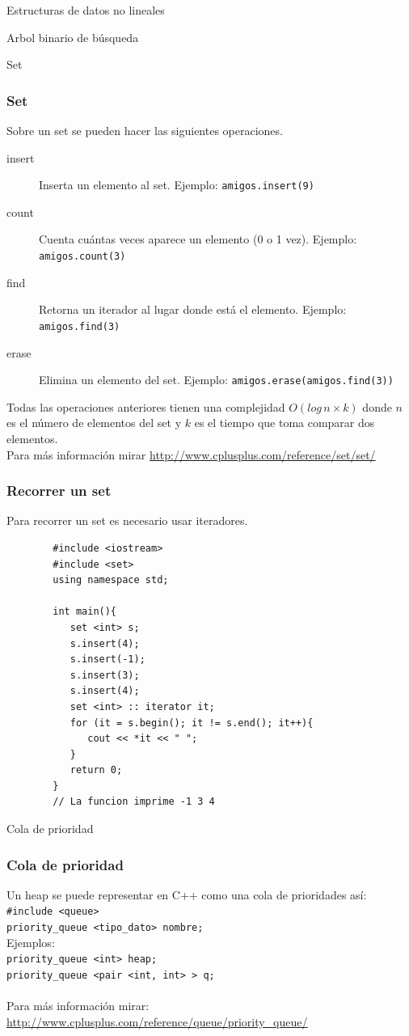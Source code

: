 \documentclass{beamer}
\begin{document}
\begin{section}{Estructuras de datos no lineales}
\begin{subsection}{Arbol binario de búsqueda}
\begin{subsubsection}{Set}
	\begin{frame}[fragile]
		\frametitle{Set}
		Sobre un set se pueden hacer las siguientes operaciones.
		\begin{description}
			\item[insert] Inserta un elemento al set. Ejemplo: \verb|amigos.insert(9)|
			\item[count] Cuenta cuántas veces aparece un elemento (0 o 1 vez). Ejemplo: \verb|amigos.count(3)|
			\item[find] Retorna un iterador al lugar donde está el elemento. Ejemplo: \verb|amigos.find(3)|
			\item[erase] Elimina un elemento del set. Ejemplo: \verb|amigos.erase(amigos.find(3))|
		\end{description}
		Todas las operaciones anteriores tienen una complejidad $O(log\,n \times k)$ donde $n$ es el número de elementos del set y $k$ es el tiempo que toma comparar dos elementos.\\
		Para más información mirar \url{http://www.cplusplus.com/reference/set/set/}
	\end{frame}

	\begin{frame}[fragile]
		\frametitle{Recorrer un set}
		Para recorrer un set es necesario usar iteradores.\\
		\begin{lstlisting}
		#include <iostream>
		#include <set>
		using namespace std;

		int main(){
		   set <int> s;
		   s.insert(4); 
		   s.insert(-1);
		   s.insert(3);
		   s.insert(4);
		   set <int> :: iterator it;
		   for (it = s.begin(); it != s.end(); it++){
		      cout << *it << " ";
		   }
		   return 0;
		}
		// La funcion imprime -1 3 4
		\end{lstlisting}
	\end{frame}
\end{subsubsection}
\begin{subsubsection}{Cola de prioridad}
	\begin{frame}[fragile]
		\frametitle{Cola de prioridad}
		Un heap se puede representar en C++ como una cola de prioridades así:
		\verb|#include <queue>|\\
		\verb|priority_queue <tipo_dato> nombre;|\\
		Ejemplos:\\
		\verb|priority_queue <int> heap;|\\
		\verb|priority_queue <pair <int, int> > q;|\\
		\quad \\
		Para más información mirar: \url{http://www.cplusplus.com/reference/queue/priority_queue/}
	\end{frame}
	

\end{subsubsection}
\end{subsection}
\end{section}
\end{document}
